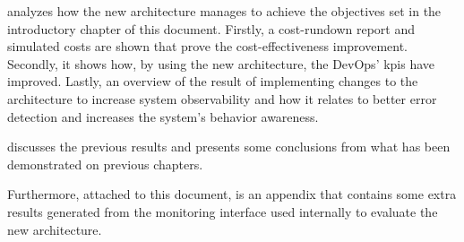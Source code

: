  analyzes how the new architecture manages to achieve the objectives set in the introductory chapter of this document. Firstly, a cost-rundown report and simulated costs are shown that prove the cost-effectiveness improvement. Secondly, it shows how, by using the new architecture, the DevOps' \gls{kpi}s have improved. Lastly, an overview of the result of implementing changes to the architecture to increase system observability and how it relates to better error detection and increases the system's behavior awareness.

 discusses the previous results and presents some conclusions from what has been demonstrated on previous chapters.

Furthermore, attached to this document, is an appendix that contains some extra results generated from the monitoring interface used internally to evaluate the new architecture.












